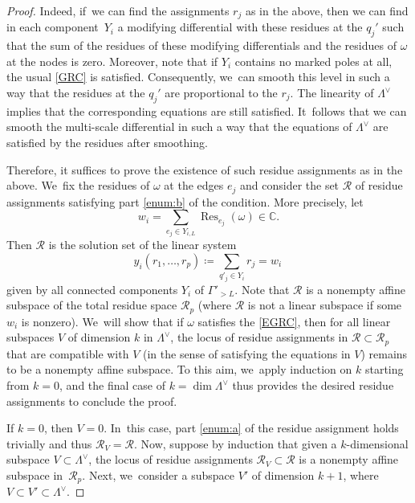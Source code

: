 \documentclass[11pt]{article}
\newcommand\CC{{\mathbb C}}
\newcommand\calR{{\mathcal R}}
\DeclareMathOperator\Res{Res}
\theoremstyle{definition}
\begin{document}
\begin{proof}
Indeed, if~we can find the assignments $r_{j}$ as in the above, then we can find in each component~$Y_{i}$ a modifying differential with these residues at the $q_{j}'$ such that the sum of the residues of these modifying differentials and the residues of $\omega$ at the nodes is zero. Moreover, note that if $Y_i$ contains no marked poles at all, the usual \ref{GRC} is satisfied. Consequently, we~can smooth this level in such a way that the residues at the $q_{j}'$ are proportional to the $r_{j}$. The linearity of $\Lambda^{\vee}$ implies that the corresponding equations are still satisfied. It~follows that we can smooth the multi-scale differential in such a way that the equations of $\Lambda^{\vee}$ are satisfied by the residues after smoothing.

Therefore, it suffices to prove the existence of such residue assignments as in the above. We~fix the residues of $\omega$ at the edges $e_{j}$ and consider the set $\calR$ of residue assignments satisfying part \eqref{enum:b} of the condition. More precisely, let
\[
w_{i}=\sum_{e_j \in Y_{i, L}}\Res_{e_j} (\omega) \in \CC.
\]
Then $\calR$ is the solution set of the linear system
\[
y_{i}(r_1,\ldots, r_p)\coloneqq\sum_{q'_j\in Y_i}r_{j}=w_{i}\,
\]
given by all connected components $Y_i$ of $\Gamma'_{>L}$.
Note that $\calR$ is a nonempty affine subspace of the total residue space $\mathcal{R}_{p}$ (where $\calR$ is not a linear subspace if some $w_i$ is nonzero). We~will show that if $\omega$ satisfies the \ref{EGRC}, then for all linear subspaces $V$ of dimension $k$ in $\Lambda^{\vee}$, the locus of residue assignments in $\calR\subset \calR_p$ that are compatible with $V$ (in the sense of satisfying the equations in $V$) remains to be a nonempty affine subspace.
To this aim, we~apply induction on $k$ starting from $k=0$, and the final case of $k=\dim \Lambda^{\vee}$ thus provides the desired residue assignments to conclude the proof.

If $k=0$, then $V=0$. In~this case, part \eqref{enum:a} of the residue assignment holds trivially and thus $\calR_{V}=\calR$.
Now, suppose by induction that given a $k$-dimensional subspace $V\subset \Lambda^{\vee}$,
the locus of residue assignments $\calR_{V}\subset \calR$ is a nonempty affine subspace in~$\calR_p$.
Next, we~consider a subspace $V'$ of dimension $k+1$, where $V\subset V'\subset \Lambda^{\vee}$.


\end{proof}
\end{document}
